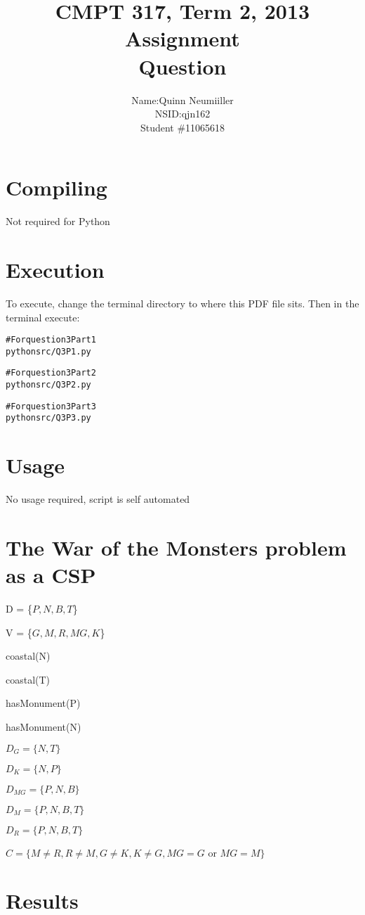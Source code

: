 \documentclass{article}
\title{CMPT 317, Term 2, 2013\\
Assignment \AssignmentNum\\
Question \QuestionNum\\
\AssignmentTitle
}
\author{
    \begin{tabular}{ l r }
      Name: & Quinn Neumiiller \\
      NSID: & qjn162 \\
      Student \# & 11065618 \\
    \end{tabular}
}
\date{\AssignmentDate}
\newcommand{\QuestionNum}{3}
\begin{document}
   \maketitle
   
   \section{Compiling}
   Not required for Python

   \section{Execution}
   To execute, change the terminal directory to where this PDF file sits.
   Then in the terminal execute:
    \begin{alltt}
    # For question \QuestionNum Part 1
    python src/Q{\QuestionNum}P1.py

    # For question \QuestionNum Part 2
    python src/Q{\QuestionNum}P2.py

    # For question \QuestionNum Part 3
    python src/Q{\QuestionNum}P3.py

    \end{alltt}

  \section{Usage}
    No usage required, script is self automated
  \section{The War of the Monsters problem as a CSP}
  {\setlength{\parindent}{0cm}
    D = \{$P, N, B, T$\}

    V = \{$G, M, R, MG, K$\}

    coastal(N)

    coastal(T)

    hasMonument(P)

    hasMonument(N)

    $D_G = \{N, T\}$

    $D_K = \{N, P\}$

    $D_{MG} = \{P, N, B\}$

    $D_M = \{P, N, B, T\}$

    $D_R = \{P, N, B, T\}$


    $C=\{M\ne R, R\ne M, G \ne K, K \ne G, MG=G$ or $MG=M\}$

  }

  \section{Results}
\end{document}
